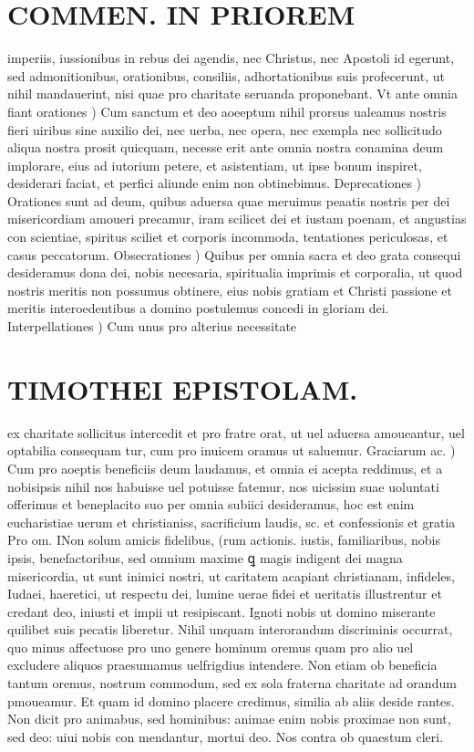 \documentclass{article}
\begin{document}
\begin{pages}
\section*{COMMEN. IN PRIOREM }
\marginpar{[ p.42 ]}\pstart imperiis, iussionibus in rebus dei agendis, nec Christus, nec Apostoli id egerunt, sed admonitionibus, orationibus, consiliis, adhortationibus suis profecerunt, ut nihil mandauerint, nisi quae pro charitate seruanda proponebant.  \pend\pstart Vt ante omnia fiant orationes ) Cum sanctum et deo aoeeptum nihil prorsus ualeamus nostris fieri uiribus sine auxilio dei, nec uerba, nec opera, nec exempla nec sollicitudo aliqua nostra prosit quicquam, necesse erit ante omnia nostra conamina deum implorare, eius ad iutorium petere, et asistentiam, ut ipse bonum inspiret, desiderari faciat, et perfici aliunde enim non obtinebimus.  \pend\pstart Deprecationes ) Orationes sunt ad deum, quibus aduersa quae meruimus peaatis nostris per dei misericordiam amoueri precamur, iram scilicet dei et iustam poenam, et angustias con scientiae, spiritus sciliet et corporis incommoda, tentationes periculosas, et casus peccatorum.  \pend\pstart Obsecrationes ) Quibus per omnia sacra et deo grata consequi desideramus dona dei, nobis necesaria, spiritualia imprimis et corporalia, ut quod nostris meritis non possumus obtinere, eius nobis gratiam et Christi passione et meritis interoedentibus a domino postulemus concedi in gloriam dei.  \pend\pstart Interpellationes ) Cum unus pro alterius necessitate  \pend
\section*{TIMOTHEI EPISTOLAM. }
\marginpar{[ p.43 ]}\pstart ex charitate sollicitus intercedit et pro fratre orat, ut uel aduersa amoueantur, uel optabilia consequam tur, cum pro inuicem oramus ut saluemur. Graciarum ac. ) Cum pro aoeptis beneficiis deum laudamus, et omnia ei acepta reddimus, et a nobisipsis nihil nos habuisse uel potuisse fatemur, nos uicissim suae uoluntati offerimus et beneplacito suo per omnia subiici desideramus, hoc est enim eucharistiae uerum et christianiss, sacrificium laudis, sc. et confessionis et gratia Pro om. INon solum amicis fidelibus, (rum actionis. iustis, familiaribus, nobis ipsis, benefactoribus, sed omnium maxime ꝗ magis indigent dei magna misericordia, ut sunt inimici nostri, ut caritatem acapiant christianam, infideles, Iudaei, haeretici, ut respectu dei, lumine uerae fidei et ueritatis illustrentur et credant deo, iniusti et impii ut resipiscant. Ignoti nobis ut domino miserante quilibet suis pecatis liberetur. Nihil unquam interorandum discriminis occurrat, quo minus affectuose pro uno genere hominum oremus quam pro alio uel excludere aliquos praesumamus uelfrigdius intendere. Non etiam ob beneficia tantum oremus, nostrum commodum, sed ex sola fraterna charitate ad orandum pmoueamur. Et quam id domino placere credimus, similia ab aliis deside rantes. Non dicit pro animabus, sed hominibus: animae enim nobis proximae non sunt, sed deo: uiui nobis con mendantur, mortui deo. Nos contra ob quaestum cleri.  \pend

\end{pages}
\end{document}
